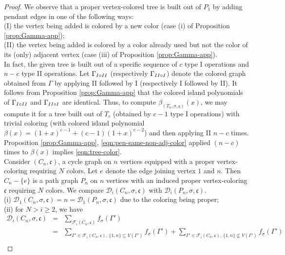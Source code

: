 \documentclass[10pt, reqno]{amsart}
\newcommand{\hf}{\hspace*{0.5cm}}
\theoremstyle{plain}
\theoremstyle{remark}
\theoremstyle{definition}
\numberwithin{equation}{section}
\begin{document}
\begin{proof}
We observe that a proper vertex-colored tree is built out of $P_1$ by adding pendant edges in one of the following ways:\\
\hf (I) the vertex being added is colored by a new color (case (i) of Proposition \ref{prop:Gamma-app});\\
\hf (II) the vertex being added is colored by a color already used but not the color of its (only) adjacent vertex (case (iii) of Proposition \ref{prop:Gamma-app}). \\
In fact, the given tree is built out of a specific sequence of $c$ type I operations and $n-c$ type II operations. Let $\Gamma_{\textup{I}\circ \textup{II}}$ (respectively $\Gamma_{\textup{II}\circ \textup{I}}$) denote the colored graph obtained from $\Gamma$ by applying II followed by I (respectively I followed by II). It follows from Proposition \ref{prop:Gamma-app} that the colored island polynomials of $\Gamma_{\textup{I}\circ \textup{II}}$ and $\Gamma_{\textup{II}\circ \textup{I}}$ are identical. Thus, to compute ${\beta}_{(T_{n},\sigma,\mathfrak{c})}(x)$, we may compute it for a tree built out of $T_c$ (obtained by $c-1$ type I operations) with trivial coloring (with colored island polynomial $\beta(x)=(1+x)^{c-1}+(c-1)(1+x)^{c-2}$) and then applying II $n-c$ times. Proposition \ref{prop:Gamma-app}, \eqref{eqn:pen-same-non-adj-color} applied $(n-c)$ times to $\beta(x)$ implies \eqref{eqn:tree-color}.\\
\hf Consider $(C_n,\mathfrak{c})$, a cycle graph on $n$ vertices equipped with a proper vertex-coloring requiring $N$ colors. Let $e$ denote the edge joining vertex $1$ and $n$. Then $C_n-\{e\}$ is a path graph $P_n$ on $n$ vertices with an induced proper vertex-coloring $\mathfrak{c}$ requiring $N$ colors. We compare $\mathscr{D}_i(C_n,\sigma,\mathfrak{c})$ with $\mathscr{D}_i(P_n,\sigma,\mathfrak{c})$.\\
\hf (i) $\mathscr{D}_1(C_n,\sigma,\mathfrak{c})=n=\mathscr{D}_1(P_n,\sigma,\mathfrak{c})$ due to the coloring being proper;\\
\hf (ii) for $N>i\geq 2$, we have
\begin{eqnarray*}
    \mathscr{D}_i(C_n,\sigma,\mathfrak{c}) & = & \sum_{\mathscr{F}_i(C_n,\mathfrak{c})}f_\sigma(\Gamma')\\
    & = & \sum_{\Gamma'\in\mathscr{F}_i(C_n,\mathfrak{c}),\,\{1,n\}\subseteq V(\Gamma')}f_\sigma(\Gamma')+\sum_{\Gamma'\in\mathscr{F}_i(C_n,\mathfrak{c}),\,\{1,n\}\not\subseteq V(\Gamma')}f_\sigma(\Gamma')\\

\end{eqnarray*}
\end{proof}
\end{document}
